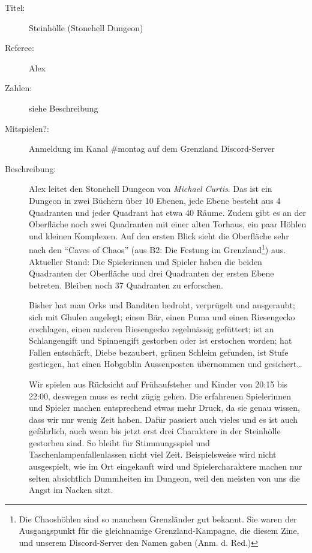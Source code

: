 \documentclass[11pt]{wbzine}
\begin{document}
\begin{multicols}{2}
\begin{description}
    \item[Titel:] Steinhölle (Stonehell Dungeon) 
	
    \item[Referee:] Alex
    
    \item[Zahlen:] siehe Beschreibung

    \item[Mitspielen?:] Anmeldung im Kanal \#montag auf dem Grenzland
	Discord-Server

    \item[Beschreibung:] Alex leitet den Stonehell Dungeon von
	\textit{Michael Curtis}. Das ist ein Dungeon in zwei Büchern über 10
	Ebenen, jede Ebene besteht aus 4 Quadranten und jeder
	Quadrant hat etwa 40 Räume. Zudem gibt es an der Oberfläche
	noch zwei Quadranten mit einer alten Torhaus, ein paar
	Höhlen und kleinen Komplexen. Auf den ersten Blick sieht die
	Oberfläche sehr nach den “Caves of Chaos” (aus B2: Die Festung im
	Grenzland\footnote{Die Chaoshöhlen sind so manchem
	Grenzländer gut bekannt. Sie waren der Ausgangspunkt für die
	gleichnamige Grenzland-Kampagne, die diesem Zine, und
	unserem Discord-Server den Namen gaben (Anm. d. Red.)}) aus.
	Aktueller Stand: Die Spielerinnen und Spieler haben die
	beiden Quadranten der Oberfläche und drei Quadranten der
	ersten Ebene betreten. Bleiben noch 37 Quadranten zu
	erforschen.

	Bisher hat man Orks und Banditen bedroht, verprügelt und
	ausgeraubt; sich mit Ghulen angelegt; einen Bär, einen Puma
	und einen Riesengecko erschlagen, einen anderen Riesengecko
	regelmässig gefüttert; ist an Schlangengift und Spinnengift
	gestorben oder ist erstochen worden; hat Fallen entschärft,
	Diebe bezaubert, grünen Schleim gefunden, ist Stufe
	gestiegen, hat einen Hobgoblin Aussenposten übernommen und
	gesichert…

	Wir spielen aus Rücksicht auf Frühaufsteher und Kinder von
	20:15 bis 22:00, deswegen muss es recht zügig gehen. Die
	erfahrenen Spielerinnen und Spieler machen entsprechend
	etwas mehr Druck, da sie genau wissen, dass wir nur wenig
	Zeit haben. Dafür passiert auch vieles und es ist auch
	gefährlich, auch wenn bis jetzt erst drei Charaktere in der
	Steinhölle gestorben sind. So bleibt für Stimmungsspiel und
	Taschenlampenfallenlassen nicht viel Zeit. Beispielsweise
	wird nicht ausgespielt, wie im Ort eingekauft wird und
	Spielercharaktere machen nur selten absichtlich Dummheiten
	im Dungeon, weil den meisten von uns die Angst im Nacken
	sitzt.


\end{description}
\end{multicols}
\end{document}
